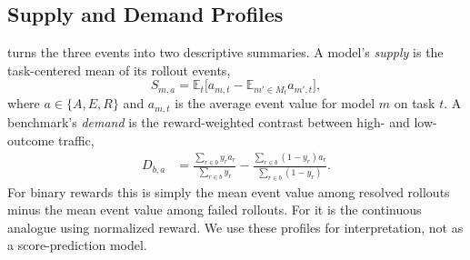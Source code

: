 \subsection{Supply and Demand Profiles}
\label{sec:supply_demand}

\method{} turns the three events into two descriptive summaries.
A model's \emph{supply} is the task-centered mean of its rollout events,
\begin{equation}
S_{m,a}=\mathbb{E}_t\bigl[a_{m,t}-\mathbb{E}_{m'\in M_t}a_{m',t}\bigr],
\end{equation}
where $a\in\{A,E,R\}$ and $a_{m,t}$ is the average event value for model $m$ on task $t$.
A benchmark's \emph{demand} is the reward-weighted contrast between high- and low-outcome traffic,
\begin{align}
D_{b,a}
&=\frac{\sum_{r\in b} y_r a_r}{\sum_{r\in b}y_r}
 -\frac{\sum_{r\in b}(1-y_r)a_r}{\sum_{r\in b}(1-y_r)}. \label{eq:demand_main}
\end{align}
For binary rewards this is simply the mean event value among resolved rollouts minus the mean event value among failed rollouts.
For \mcp{} it is the continuous analogue using normalized reward.
We use these profiles for interpretation, not as a score-prediction model.
